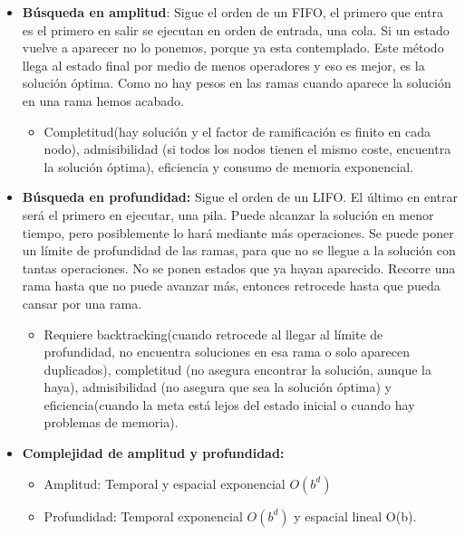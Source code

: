 \documentclass[12pt, twoside, openright]{report} %
\begin{document}
  \begin{itemize}
  \item \textbf{Búsqueda en amplitud}: Sigue el orden de un FIFO, el primero
    que entra es el primero en salir se ejecutan en orden de entrada,
    una cola. Si un estado vuelve a aparecer no lo ponemos, porque ya
    esta contemplado. Este método llega al estado final por medio de
    menos operadores y eso es mejor, es la solución óptima. Como no hay
    pesos en las ramas cuando aparece la solución en una rama hemos
    acabado.
    

    \begin{itemize}
    \item Completitud(hay solución y el factor de ramificación es finito en
      cada nodo), admisibilidad (si todos los nodos tienen el mismo
      coste, encuentra la solución óptima), eficiencia y consumo de
      memoria exponencial.
      
    \end{itemize}
\pagebreak
  \item \textbf{Búsqueda en profundidad:} Sigue el orden de un LIFO. El
    último en entrar será el primero en ejecutar, una pila. Puede
    alcanzar la solución en menor tiempo, pero posiblemente lo hará
    mediante más operaciones. Se puede poner un límite de profundidad de
    las ramas, para que no se llegue a la solución con tantas
    operaciones. No se ponen estados que ya hayan aparecido. Recorre una
    rama hasta que no puede avanzar más, entonces retrocede hasta que
    pueda cansar por una rama.
    

    \begin{itemize}
    \item Requiere backtracking(cuando retrocede al llegar al límite de
      profundidad, no encuentra soluciones en esa rama o solo aparecen
      duplicados), completitud (no asegura encontrar la solución, aunque
      la haya), admisibilidad (no asegura que sea la solución óptima) y
      eficiencia(cuando la meta está lejos del estado inicial o cuando
      hay problemas de memoria).
      
    \end{itemize}
  \item \textbf{Complejidad de amplitud y profundidad:}
    

    \begin{itemize}
    \item Amplitud: Temporal y espacial exponencial $O(b^d)$
      
    \item Profundidad: Temporal exponencial $O(b^d)$ y espacial lineal
      O(b).
      

\end{itemize}
\end{itemize}
\end{document}
